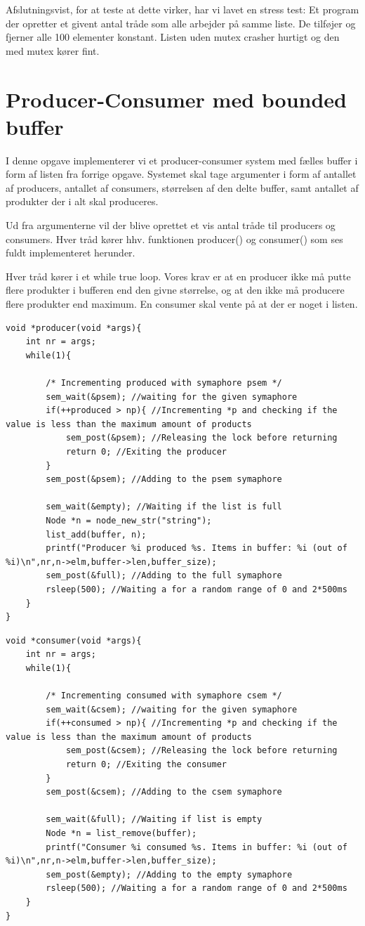 \documentclass[danish]{report}
\begin{document}
Afslutningsvist, for at teste at dette virker, har vi lavet en stress test: Et program der opretter et givent antal tråde som alle arbejder på samme liste. De tilføjer og fjerner alle 100 elementer konstant. Listen uden mutex crasher hurtigt og den med mutex kører fint.


\chapter{Producer-Consumer med bounded buffer}

I denne opgave implementerer vi et producer-consumer system med fælles buffer i form af listen fra forrige opgave. Systemet skal tage argumenter i form af antallet af producers, antallet af consumers, størrelsen af den delte buffer, samt antallet af produkter der i alt skal produceres.

Ud fra argumenterne vil der blive oprettet et vis antal tråde til producers og consumers. Hver tråd kører hhv. funktionen producer() og consumer() som ses fuldt implementeret herunder.

Hver tråd kører i et while true loop. Vores krav er at en producer ikke må putte flere produkter i bufferen end den givne størrelse, og at den ikke må producere flere produkter end maximum. En consumer skal vente på at der er noget i listen.

\begin{lstlisting}    
void *producer(void *args){
	int nr = args;
	while(1){
	
		/* Incrementing produced with symaphore psem */
		sem_wait(&psem); //waiting for the given symaphore
		if(++produced > np){ //Incrementing *p and checking if the value is less than the maximum amount of products
			sem_post(&psem); //Releasing the lock before returning
			return 0; //Exiting the producer
		}
		sem_post(&psem); //Adding to the psem symaphore
		
		sem_wait(&empty); //Waiting if the list is full
		Node *n = node_new_str("string");
		list_add(buffer, n);
		printf("Producer %i produced %s. Items in buffer: %i (out of %i)\n",nr,n->elm,buffer->len,buffer_size);
		sem_post(&full); //Adding to the full symaphore
		rsleep(500); //Waiting a for a random range of 0 and 2*500ms
	}
}
\end{lstlisting}

\begin{lstlisting}    
void *consumer(void *args){
	int nr = args;
	while(1){
	
		/* Incrementing consumed with symaphore csem */
		sem_wait(&csem); //waiting for the given symaphore
		if(++consumed > np){ //Incrementing *p and checking if the value is less than the maximum amount of products
			sem_post(&csem); //Releasing the lock before returning
			return 0; //Exiting the consumer
		}
		sem_post(&csem); //Adding to the csem symaphore
		
		sem_wait(&full); //Waiting if list is empty
		Node *n = list_remove(buffer);
		printf("Consumer %i consumed %s. Items in buffer: %i (out of %i)\n",nr,n->elm,buffer->len,buffer_size);
		sem_post(&empty); //Adding to the empty symaphore
		rsleep(500); //Waiting a for a random range of 0 and 2*500ms
	}
}
\end{lstlisting}
\end{document}

